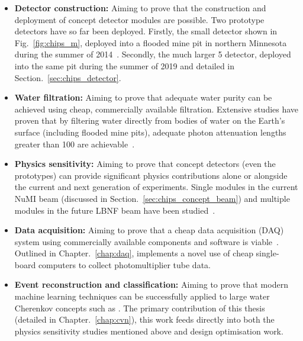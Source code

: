 \begin{itemize}
    \item \textbf{Detector construction:} Aiming to prove that the construction and deployment of
          \chips concept detector modules are possible. Two prototype detectors have so far been
          deployed. Firstly, the small \chipsm detector shown in Fig.~\ref{fig:chips_m}, deployed
          into a flooded mine pit in northern Minnesota during the summer of 2014~\cite{perch2015,
              pfutznerProto2017, pfutzner2017}. Secondly, the much larger \unit{5}{}
          \chipsfive detector, deployed into the same pit during the summer of 2019 and detailed
          in Section.~\ref{sec:chips_detector}.

    \item \textbf{Water filtration:} Aiming to prove that adequate water purity can be achieved
          using cheap, commercially available filtration. Extensive studies have proven that by
          filtering water directly from bodies of water on the Earth's surface (including flooded
          mine pits), adequate photon attenuation lengths greater than \unit{100}{} are
          achievable~\cite{amat2017, campbell2020}.

    \item \textbf{Physics sensitivity:} Aiming to prove that \chips concept detectors (even the
          prototypes) can provide significant physics contributions alone or alongside the current
          and next generation of experiments. Single modules in the current NuMI beam (discussed
          in Section.~\ref{sec:chips_concept_beam}) and multiple modules in the future LBNF beam
          have been studied~\cite{pfutzner2017, adde2016, lang2015}.

    \item \textbf{Data acquisition:} Aiming to prove that a cheap data acquisition (DAQ) system
          using commercially available components and software is viable~\cite{eijk2018}. Outlined
          in Chapter.~\ref{chap:daq}, \chips implements a novel use of cheap single-board
          computers to collect photomultiplier tube data.

    \item \textbf{Event reconstruction and classification:} Aiming to prove that modern machine
          learning techniques can be successfully applied to large water Cherenkov concepts such
          as \chips. The primary contribution of this thesis (detailed in
          Chapter.~\ref{chap:cvn}), this work feeds directly into both the physics sensitivity
          studies mentioned above and design optimisation work.
\end{itemize}

